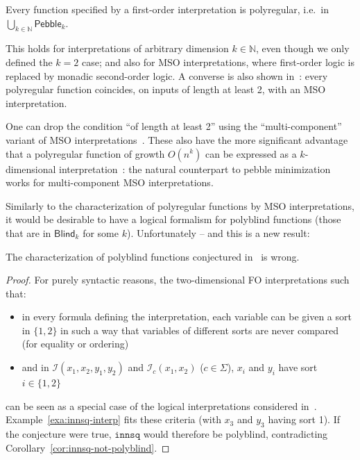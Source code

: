 \documentclass{fundam}
\newcommand{\bbN}{\mathbb{N}}
\newcommand{\cI}{\mathcal{I}}
\newcommand{\Pebble}{\mathsf{Pebble}}
\newcommand{\Blind}{\mathsf{Blind}}
\theoremstyle{claimstyle}
\newcommand\innsq{\mathtt{innsq}}
\begin{document}
\begin{theorem}\label{thm:interp-polyreg}
  Every function specified by a first-order interpretation is polyregular, i.e.\
  in $\displaystyle\bigcup_{k\in\bbN}\Pebble_k$.
\end{theorem}

This holds for interpretations of arbitrary dimension $k\in\bbN$, even though we
only defined the $k=2$ case; and also for MSO interpretations, where first-order
logic is replaced by monadic second-order logic. A converse is also shown
in~\cite{msoInterpretations}: every polyregular function coincides, on inputs of
length at least 2, with an MSO interpretation.
\begin{remark}\label{rem:mso-interp}
  One can drop the condition \enquote{of length at least 2} using the
  \enquote{multi-component} variant of MSO
  interpretations~\cite[\S5.1]{PolyregSurvey}. These also have the more
  significant advantage that a polyregular function of growth $O(n^k)$ can be
  expressed as a $k$-dimensional interpretation~\cite[\S2]{PolyregGrowth}: the
  natural counterpart to pebble minimization works for multi-component MSO
  interpretations.
\end{remark}

Similarly to the characterization of polyregular functions by MSO
interpretations, it would be desirable to have a logical formalism for polyblind
functions (those that are in $\Blind_k$ for some $k$). Unfortunately -- and this
is a new result:
\begin{theorem}
  \label{thm:polyblind-refutation}
  The characterization of polyblind functions conjectured in~\cite[\S10]{NguyenNP21} is wrong.
\end{theorem}
\begin{proof}
For purely syntactic reasons, the two-dimensional FO interpretations such that:
\begin{itemize}
  \item in every formula defining the interpretation, each variable can be given a sort in $\{1,2\}$ in such a way that variables of different sorts are never compared (for equality or ordering)
  \item and in $\cI(x_1,x_2,y_1,y_2)$ and $\cI_c(x_1,x_2)$ ($c\in\Sigma$), $x_i$ and $y_i$ have sort $i\in\{1,2\}$
\end{itemize}
 can be seen as a special case of the logical interpretations considered in~\cite[Conjecture~10.1]{NguyenNP21}. Example~\ref{exa:innsq-interp} fits these criteria (with $x_3$ and $y_3$ having sort 1). If the conjecture were true, $\innsq$ would therefore be polyblind, contradicting Corollary~\ref{cor:innsq-not-polyblind}.
\end{proof}
  
\end{document}
